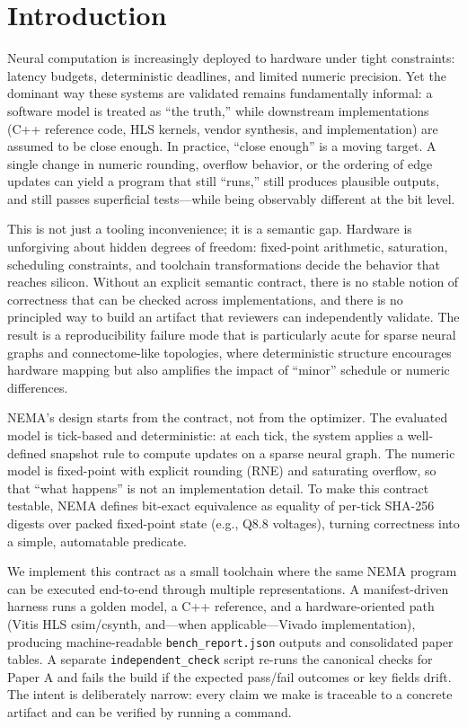 \section{Introduction}

Neural computation is increasingly deployed to hardware under tight constraints: latency budgets, deterministic deadlines, and limited numeric precision. Yet the dominant way these systems are validated remains fundamentally informal: a software model is treated as ``the truth,'' while downstream implementations (C++ reference code, HLS kernels, vendor synthesis, and implementation) are assumed to be close enough. In practice, ``close enough'' is a moving target. A single change in numeric rounding, overflow behavior, or the ordering of edge updates can yield a program that still ``runs,'' still produces plausible outputs, and still passes superficial tests---while being observably different at the bit level.

This is not just a tooling inconvenience; it is a semantic gap. Hardware is unforgiving about hidden degrees of freedom: fixed-point arithmetic, saturation, scheduling constraints, and toolchain transformations decide the behavior that reaches silicon. Without an explicit semantic contract, there is no stable notion of correctness that can be checked across implementations, and there is no principled way to build an artifact that reviewers can independently validate. The result is a reproducibility failure mode that is particularly acute for sparse neural graphs and connectome-like topologies, where deterministic structure encourages hardware mapping but also amplifies the impact of ``minor'' schedule or numeric differences.

NEMA's design starts from the contract, not from the optimizer. The evaluated model is tick-based and deterministic: at each tick, the system applies a well-defined snapshot rule to compute updates on a sparse neural graph. The numeric model is fixed-point with explicit rounding (RNE) and saturating overflow, so that ``what happens'' is not an implementation detail. To make this contract testable, NEMA defines bit-exact equivalence as equality of per-tick SHA-256 digests over packed fixed-point state (e.g., Q8.8 voltages), turning correctness into a simple, automatable predicate.

We implement this contract as a small toolchain where the same NEMA program can be executed end-to-end through multiple representations. A manifest-driven harness runs a golden model, a C++ reference, and a hardware-oriented path (Vitis HLS csim/csynth, and---when applicable---Vivado implementation), producing machine-readable \texttt{bench\_report.json} outputs and consolidated paper tables. A separate \texttt{independent\_check} script re-runs the canonical checks for Paper A and fails the build if the expected pass/fail outcomes or key fields drift. The intent is deliberately narrow: every claim we make is traceable to a concrete artifact and can be verified by running a command.

